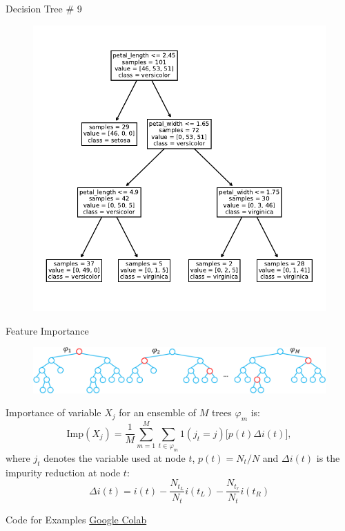 \documentclass{beamer}
\begin{document}
\begin{frame}{Decision Tree \# 9}
\begin{figure}
\includegraphics[scale=0.7]{tree-9.pdf}
\end{figure}
\end{frame}

\begin{frame}{Feature Importance\footnotemark}
\begin{figure}
	\includegraphics[scale=0.4]{mdi.pdf}
\end{figure}
Importance of variable $X_j$ for an ensemble of $M$ trees $\varphi_{m}$ is:
\begin{equation*}
\text{Imp}(X_j) = \frac{1}{M} \sum_{m=1}^M \sum_{t \in \varphi_{m}} 1(j_t = j) \Big[ p(t) \Delta i(t) \Big],
\end{equation*}
where $j_t$ denotes the variable used at node $t$, $p(t)=N_t/N$ and $\Delta i(t)$ is the impurity reduction at node $t$:
\begin{equation*}
\Delta i(t) = i(t) - \frac{N_{t_L}}{N_t} i(t_L) - \frac{N_{t_r}}{N_t} i(t_R)
\end{equation*}

\end{frame}


	\begin{frame}{Code for Examples}
		\centering
		\href{https://colab.research.google.com/drive/1Yix-Hn1zqT6o-wOQkoiBhjKklzhJgekF}{Google Colab}
	\end{frame}
\end{document}
